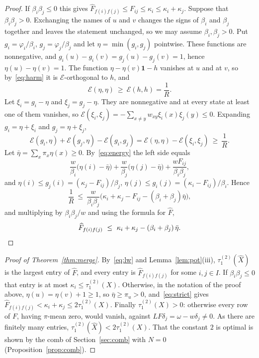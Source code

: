 \documentclass[11pt]{amsart}
\theoremstyle{definition}
\newcommand{\tmix}{\tau_1^{(2)}}
\newcommand{\hX}{\widehat{X}}
\newcommand{\hF}{\widehat{F}}
\newcommand{\one}{\mathbf{1}}
\begin{document}
\begin{proof}
If $\beta_i\beta_j\le0$ this gives $\hF_{f(i)f(j)}\le F_{ij}\le\kappa_i\le\kappa_i+\kappa_j$. Suppose that
$\beta_i\beta_j>0$. Exchanging the names of $u$ and $v$ changes the signs of $\beta_i$ and $\beta_j$ together and
leaves the statement unchanged, so we may assume $\beta_i,\beta_j>0$. Put $g_i=\varphi_i/\beta_i$,
$g_j=\varphi_j/\beta_j$ and let $\eta=\min(g_i,g_j)$ pointwise. These functions are nonnegative, and
$g_i(u)-g_i(v)=g_j(u)-g_j(v)=1$, hence $\eta(u)-\eta(v)=1$. The function $\eta-\eta(v)\one-h$ vanishes at $u$ and at
$v$, so by~\eqref{eq:harm} it is $\mathcal E$-orthogonal to $h$, and
\[
\mathcal E(\eta,\eta)\ \ge\ \mathcal E(h,h)=\frac1R .
\]
Let $\xi_i=g_i-\eta$ and $\xi_j=g_j-\eta$. They are nonnegative and at every state at least one of them vanishes, so
$\mathcal E(\xi_i,\xi_j)=-\sum_{x\ne y}w_{xy}\xi_i(x)\xi_j(y)\le0$. Expanding $g_i=\eta+\xi_i$ and $g_j=\eta+\xi_j$,
\[
\mathcal E(g_i,\eta)+\mathcal E(g_j,\eta)-\mathcal E(g_i,g_j)=\mathcal E(\eta,\eta)-\mathcal E(\xi_i,\xi_j)
\ \ge\ \frac1R .
\]
Let $\bar\eta=\sum_x\pi_x\eta(x)\ge0$. By~\eqref{eq:energy} the left side equals
\[
\frac w{\beta_i}\bigl(\eta(i)-\bar\eta\bigr)+\frac w{\beta_j}\bigl(\eta(j)-\bar\eta\bigr)+\frac{wF_{ij}}{\beta_i\beta_j},
\]
and $\eta(i)\le g_j(i)=(\kappa_j-F_{ij})/\beta_j$, $\eta(j)\le g_i(j)=(\kappa_i-F_{ij})/\beta_i$. Hence
\[
\frac1R\ \le\ \frac w{\beta_i\beta_j}\bigl(\kappa_i+\kappa_j-F_{ij}-(\beta_i+\beta_j)\bar\eta\bigr),
\]
and multiplying by $\beta_i\beta_j/w$ and using the formula for $\hF$,
\begin{equation}\label{eq:strict}
\hF_{f(i)f(j)}\ \le\ \kappa_i+\kappa_j-(\beta_i+\beta_j)\,\bar\eta . \qedhere
\end{equation}
\end{proof}

\begin{proof}[Proof of Theorem~\ref{thm:merge}]
By~\eqref{eq:lw} and Lemma~\ref{lem:pot}(iii), $\tmix(\hX)$ is the largest entry of $\hF$, and every entry is
$\hF_{f(i)f(j)}$ for some $i,j\in I$. If $\beta_i\beta_j\le0$ that entry is at most $\kappa_i\le\tmix(X)$. Otherwise,
in the notation of the proof above, $\eta(u)=\eta(v)+1\ge1$, so $\bar\eta\ge\pi_u>0$, and~\eqref{eq:strict} gives
$\hF_{f(i)f(j)}<\kappa_i+\kappa_j\le2\tmix(X)$. Finally $\tmix(X)>0$: otherwise every row of $F$, having
$\pi$-mean zero, would vanish, against $LF\delta_j=\omega-w\delta_j\ne0$. As there are finitely many entries,
$\tmix(\hX)<2\tmix(X)$. That the constant $2$ is optimal is shown by the comb of Section~\ref{sec:comb} with $N=0$
(Proposition~\ref{prop:comb}).
\end{proof}
\end{document}
